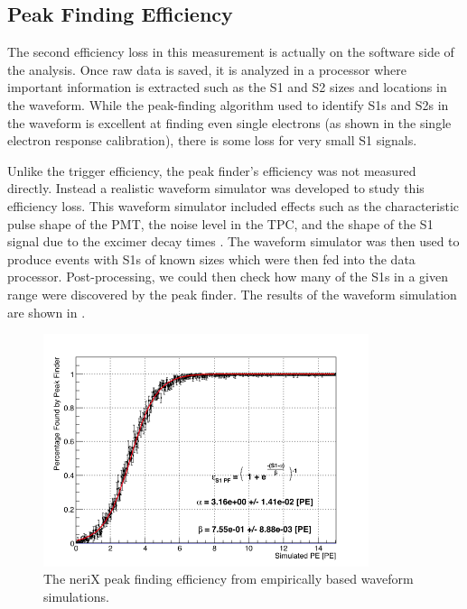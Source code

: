 \subsection{Peak Finding Efficiency}
\label{sec:nerix_pf_efficiency}

The second efficiency loss in this measurement is actually on the software side of the analysis.  Once raw data is saved, it is analyzed in a processor where important information is extracted such as the S1 and S2 sizes and locations in the waveform.  While the peak-finding algorithm used to identify S1s and S2s in the waveform is excellent at finding even single electrons (as shown in the single electron response calibration), there is some loss for very small S1 signals.  

Unlike the trigger efficiency, the peak finder's efficiency was not measured directly.  Instead a realistic waveform simulator was developed to study this efficiency loss.  This waveform simulator included effects such as the characteristic pulse shape of the PMT, the noise level in the TPC, and the shape of the S1 signal due to the excimer decay times \cite{hitachi1983effect}.  The waveform simulator was then used to produce events with S1s of known sizes which were then fed into the data processor.  Post-processing, we could then check how many of the S1s in a given range were discovered by the peak finder.  The results of the waveform simulation are shown in .

\begin{figure}[t]
        \centering
	\includegraphics[width=0.85\textwidth]{nerix_peak_finder_efficiency}
	\caption{The neriX peak finding efficiency from empirically based waveform simulations.}
	\label{fig:nerix_peak_finder_efficiency}
\end{figure}





